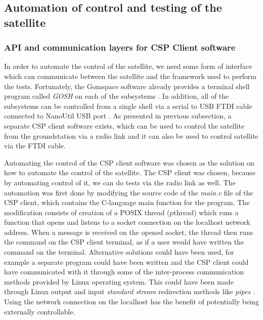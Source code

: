 \documentclass[english,12pt,a4paper,pdftex,elec,utf8]{aaltothesis}
\begin{document}
\subsection{Automation of control and testing of the satellite}
\subsubsection{API and communication layers for CSP Client software}
In order to automate the control of the satellite, we need some form of interface which can
communicate between the satellite and the framework used to perform the tests.
Fortunately, the Gomspace software already provides a terminal shell program called \textit{GOSH} on each of the subsystems \cite{nanomindds}. In addition, all of the subsystems can be controlled from a single shell via a serial to USB FTDI cable connected to NanoUtil USB port \cite{avrtoolchain}. As presented in previous subsection,  a separate CSP client
software exists, which can be used to control the satellite from the 
groundstation via a radio link and it can also be used to control satellite via the FTDI cable.\par
Automating the control of the CSP client software was chosen as the solution on how to 
automate the control of the satellite. The CSP client was chosen, because by automating
control of it, we can do tests via the radio link as well. The automation was first done by
modifying the source code of the \textit{main.c} file of the CSP client, which contains the C-language main function for the program. The modification consists of creation of a POSIX thread (pthread) which runs a function that opens and listens to a socket connection on the localhost network address. When a message is received on the opened socket, the thread then runs the command on the CSP client terminal, as if a user would have written the command on the terminal. Alternative solutions could have been used, for example a separate program could have been written and the CSP client could have communicated with it through some of the inter-process communication methods provided by Linux operating system. This could have been made through Linux output and input \textit{standard stream} redirection methods like \textit{pipes} \cite{linuxproginterface}. Using the network connection on the localhost has the benefit of potentially being externally controllable.\par 
\end{document}

